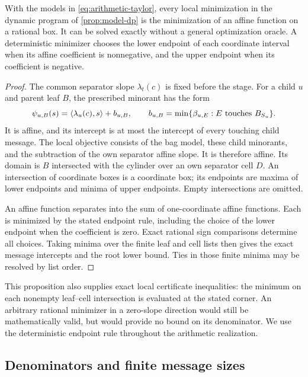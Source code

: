 \begin{proposition}
\label{prop:arithmetic-endpoints}
With the models in \cref{eq:arithmetic-taylor}, every local minimization in
the dynamic program of \cref{prop:model-dp} is the minimization of an affine
function on a rational box.  It can be solved exactly without a general
optimization oracle.  A deterministic minimizer chooses the lower endpoint
of each coordinate interval when its affine coefficient is nonnegative,
and the upper endpoint when its coefficient is negative.
\end{proposition}

\begin{proof}
The common separator slope $\lambda_t(c)$ is fixed before the stage.  For a
child $u$ and parent leaf $B$, the prescribed minorant has the form
\[
 \psi_{u,B}(s)=\left\langle \lambda_u(c),s\right\rangle+b_{u,B},
 \qquad
 b_{u,B}=\min\{\beta_{u,E}: E\text{ touches }B_{S_u}\}.
\]
It is affine, and its intercept is at most the intercept of every touching
child message.  The local objective consists of the bag model, these child
minorants, and the subtraction of the own separator affine slope.  It is
therefore affine.  Its domain is $B$ intersected with the cylinder over an
own separator cell $D$.  An intersection of coordinate boxes is a coordinate
box; its endpoints are maxima of lower endpoints and minima of upper
endpoints.  Empty intersections are omitted.

An affine function separates into the sum of one-coordinate affine
functions.  Each is minimized by the stated endpoint rule, including the
choice of the lower endpoint when the coefficient is zero.  Exact rational
sign comparisons determine all choices.  Taking minima over the finite
leaf and cell lists then gives the exact message intercepts and the root
lower bound.  Ties in those finite minima may be resolved by list order.
\end{proof}

This proposition also supplies exact local certificate inequalities: the
minimum on each nonempty leaf--cell intersection is evaluated at the stated
corner.  An arbitrary rational minimizer in a zero-slope direction would
still be mathematically valid, but would provide no bound on its denominator.
We use the deterministic endpoint rule throughout the arithmetic realization.

\subsection{Denominators and finite message sizes}

